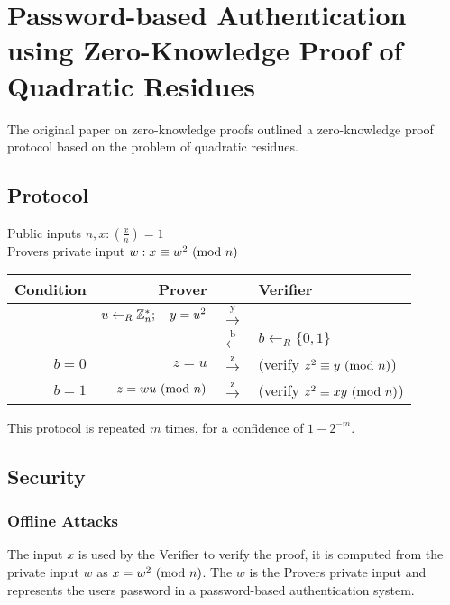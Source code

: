 \section{Password-based Authentication using Zero-Knowledge Proof of Quadratic Residues}

The original paper on zero-knowledge proofs outlined a zero-knowledge proof protocol based on the problem of quadratic residues.

\subsection{Protocol} %

Public inputs $n,x: (\frac{x}{n}) = 1$\\
Provers private input $w: x \equiv w^2 \ (\mathrm{mod}\ n)$\\

\begin{center} %
	\begin{tabular}{rrcl}
		Condition & Prover & & Verifier\\
		\hline
		& $u \leftarrow_R \Bbb{Z}_{n}^{*}; \quad y = u^2$ & $\xrightarrow{\text{y}}$ \\
		&& $\xleftarrow{\text{b}}$ & $b \leftarrow_R \{0, 1\} $ \\
		$b = 0$ & $ z = u$ & $ \xrightarrow{\text{z}}$ & (verify $z^2 \equiv y \ (\mathrm{mod}\ n)$)\\
		$b = 1$ & $ z = wu \ (\mathrm{mod}\ n)$ & $ \xrightarrow{\text{z}}$ & (verify $z^2 \equiv xy \ (\mathrm{mod}\ n)$)\\ %
	\end{tabular}
\end{center}

This protocol is repeated $m$ times, for a confidence of $1 - 2^{-m}$.

\subsection{Security}

\subsubsection{Offline Attacks}
The input $x$ is used by the Verifier to verify the proof, it is computed from the private input $w$ as $x = w^2 \ (\mathrm{mod}\ n)$.
The $w$ is the Provers private input and represents the users password in a password-based authentication system.

